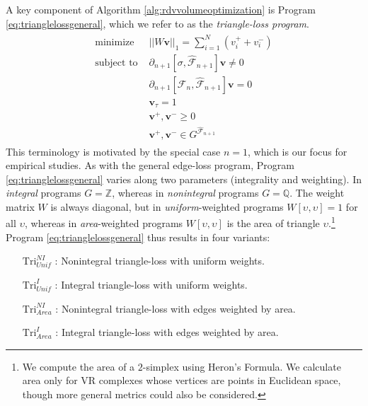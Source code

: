 \documentclass[11pt,onecolumn]{article}
\makeatletter
\def\namedlabel#1#2{\begingroup
    #2%
    \def\@currentlabel{#2}%
    \phantomsection\label{#1}\endgroup:
}
\newcommand{\Z}{\mathbb{Z}}
\newcommand{\Q}{\mathbb{Q}}
\newcommand{\volvec}{\mathbf{v}}
\newcommand{\NI}{^{NI}}
\newcommand{\I}{^I}
\newcommand{\unif}{_{Unif}}
\newcommand{\area}{_{Area}}
\newcommand{\Tri}{\mathrm{Tri}}
\theoremstyle{plain}
\theoremstyle{definition}
\makeatother
\begin{document}
A key component of Algorithm \ref{alg:rdvvolumeoptimization} is Program \eqref{eq:trianglelossgeneral}, which we refer to as the \emph{triangle-loss program}.
\begin{align}
\begin{split}
 \text{minimize } & ||W \mathbf{v} ||_1 = \sum_{i=1}^N (v_i^+ + v_i^-)  \\
\text{subject to } &  \partial_{n+1}[ \sigma , \hat {\mathcal{F}}_{n+1} ] \volvec \neq 0     \\
&  \partial_{n+1}[\mathcal{F}_n, \hat {\mathcal{F}}_{n+1} ] \volvec = 0 \\
 & \volvec_{\tau} = 1\\
     & \mathbf{v}^+, \mathbf{v}^- \ge 0 \\
& \mathbf{v}^+, \mathbf{v}^- \in G^{ \hat {\mathcal{F}}_{n+1}}
\end{split}
\label{eq:trianglelossgeneral}
\end{align} 
This terminology is motivated by the special case $n=1$, which is our focus for  empirical studies.  As with the general edge-loss program, Program \eqref{eq:trianglelossgeneral} varies along two  parameters (integrality and weighting).  In \emph{integral} programs $G = \Z$, whereas in \emph{nonintegral} programs $G = \Q$.  The weight matrix $W$ is always diagonal, but in \emph{uniform}-weighted programs $W[\upsilon, \upsilon] = 1$ for all $\upsilon$, whereas in \emph{area}-weighted programs $W[\upsilon, \upsilon]$ is the area of triangle $\upsilon$.\footnote{We compute the area of a $2$-simplex using Heron's Formula.  We calculate area only for VR complexes whose vertices are points in Euclidean space, though more general metrics could also be considered.} Program \eqref{eq:trianglelossgeneral} thus results in four variants:
 
 
\begin{center}
\begin{itemize}[leftmargin=1in]
     \item[\namedlabel{itm:tri_NIU}{$ \Tri\NI\unif$}] Nonintegral triangle-loss with uniform weights.
     \item[\namedlabel{itm:tri_IU}{ $\Tri\I\unif$}] Integral triangle-loss with uniform weights.
    \item[\namedlabel{itm:tri_NIA}{ $\Tri\NI\area$}] Nonintegral triangle-loss with edges weighted by area. 
      \item[\namedlabel{itm:tri_IA}{ $\Tri\I\area$}] Integral triangle-loss with edges weighted by area. 
\end{itemize}
 \end{center}
\end{document}
